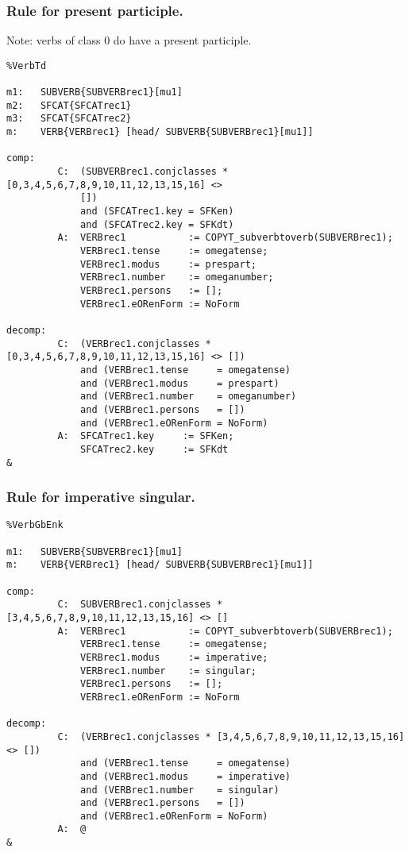 \subsubsection{Rule for present participle.}

Note: verbs of class 0 do have a present participle.

\begin{verbatim}
%VerbTd 

m1:   SUBVERB{SUBVERBrec1}[mu1]
m2:   SFCAT{SFCATrec1}
m3:   SFCAT{SFCATrec2}
m:    VERB{VERBrec1} [head/ SUBVERB{SUBVERBrec1}[mu1]]

comp:
         C:  (SUBVERBrec1.conjclasses * [0,3,4,5,6,7,8,9,10,11,12,13,15,16] <> 
             []) 
             and (SFCATrec1.key = SFKen) 
             and (SFCATrec2.key = SFKdt)
         A:  VERBrec1           := COPYT_subverbtoverb(SUBVERBrec1);
             VERBrec1.tense     := omegatense;
             VERBrec1.modus     := prespart;
             VERBrec1.number    := omeganumber;
             VERBrec1.persons   := [];
             VERBrec1.eORenForm := NoForm

decomp:
         C:  (VERBrec1.conjclasses * [0,3,4,5,6,7,8,9,10,11,12,13,15,16] <> [])
             and (VERBrec1.tense     = omegatense) 
             and (VERBrec1.modus     = prespart)
             and (VERBrec1.number    = omeganumber)
             and (VERBrec1.persons   = []) 
             and (VERBrec1.eORenForm = NoForm)
         A:  SFCATrec1.key     := SFKen;
             SFCATrec2.key     := SFKdt
&
\end{verbatim}
\newpage
\subsubsection{Rule for imperative singular.}
\begin{verbatim}
%VerbGbEnk 

m1:   SUBVERB{SUBVERBrec1}[mu1]
m:    VERB{VERBrec1} [head/ SUBVERB{SUBVERBrec1}[mu1]]

comp:
         C:  SUBVERBrec1.conjclasses * [3,4,5,6,7,8,9,10,11,12,13,15,16] <> []
         A:  VERBrec1           := COPYT_subverbtoverb(SUBVERBrec1);
             VERBrec1.tense     := omegatense;
             VERBrec1.modus     := imperative;
             VERBrec1.number    := singular;
             VERBrec1.persons   := [];
             VERBrec1.eORenForm := NoForm

decomp:
         C:  (VERBrec1.conjclasses * [3,4,5,6,7,8,9,10,11,12,13,15,16] <> [])
             and (VERBrec1.tense     = omegatense) 
             and (VERBrec1.modus     = imperative)
             and (VERBrec1.number    = singular) 
             and (VERBrec1.persons   = [])
             and (VERBrec1.eORenForm = NoForm)
         A:  @
&
\end{verbatim}
\newpage
